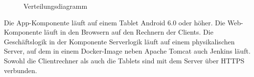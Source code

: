 \begin{figure}[h]
	\centering
	\caption{Verteilungsdiagramm}
	\label{fig:verteilungsdiagramm}
\end{figure}

Die App-Komponente läuft auf einem Tablet Android 6.0 oder höher.
Die Web-Komponente läuft in den Browsern auf den Rechnern der Clients.
Die Geschäftslogik in der Komponente Serverlogik läuft auf einem physikalischen Server, auf dem in einem Docker-Image neben Apache Tomcat auch Jenkins läuft.
Sowohl die Clientrechner als auch die Tablets sind mit dem Server über HTTPS verbunden.